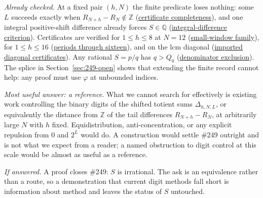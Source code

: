 \documentclass[11pt]{article}
\newcommand{\commit}{bb4e24651b37cd096d3749ef299c3317930b3a3b}
\newcommand{\repobase}{https://github.com/wcook04/plectis-lean-erdos249-257/blob/\commit}
\newcommand{\PK}{Erdos249257}
\newcommand{\lword}[4]{\href{\repobase/\PK/#1\#L#2}{#4}}
\theoremstyle{definition}
\theoremstyle{remark}
\newcommand{\Z}{\mathbb{Z}}
\newcommand{\Q}{\mathbb{Q}}
\newcommand{\ph}{\varphi}
\newcommand{\Qzero}{Q_0}
\begin{document}
\emph{Already checked.}  At a fixed pair \((h,N)\) the finite predicate loses
nothing: some \(L\) succeeds exactly when \(R_{N+h}-R_N\notin\Z\)
(\lword{LcmConeFlatness.lean}{316}{exists_certifiedKill_iff_tail_diff_notMem_int}{certificate completeness}),
and one integral positive-shift difference already forces \(S\in\Q\)
(\lword{LcmConeFlatness.lean}{357}{not_irrational_of_tail_diff_mem_int}{integral-difference criterion}).
Certificates are verified for \(1\le h\le8\) at \(N=12\)
(\lword{TotientTailPeriodKiller.lean}{404}{certifiedKill_all_small}{small-window family}),
for \(1\le h\le16\)
(\lword{CarrySurvivorExtinction.lean}{574}{certifiedKill_all_upto_sixteen}{periods through sixteen}),
and on the lcm diagonal
(\lword{DiagonalPincerCertificatesT64.lean}{1967}{certifiedKill_diagonal_all_imported_through_t64}{imported diagonal certificates}).
Any rational \(S=p/q\) has \(q>\Qzero\)
(\lword{CertificateKernel.lean}{18384}{tsum_totient_div_pow_two_ne_ratCast_of_den_le_79639646646701375323355774875831053}{denominator exclusion}).
The splice in Section~\ref{sec:249-open} shows that extending the finite
record cannot help: any proof must use \(\ph\) at unbounded indices.

\emph{Most useful answer: a reference.}  What we cannot search for
effectively is existing work controlling the binary digits of the shifted
totient sums \(\Delta_{h,N,L}\), or equivalently the distance from \(\Z\) of
the tail differences \(R_{N+h}-R_N\), at arbitrarily large \(N\) with \(h\)
fixed.  Equidistribution, anti-concentration, or any explicit repulsion from
\(0\) and \(2^L\) would do.  A construction would settle \#249 outright and
is not what we expect from a reader; a named obstruction to digit control at
this scale would be almost as useful as a reference.

\emph{If answered.}  A proof closes \#249: \(S\) is irrational.  The ask is
an equivalence rather than a route, so a demonstration that current digit
methods fall short is information about method and leaves the status of
\(S\) untouched.
\end{document}
